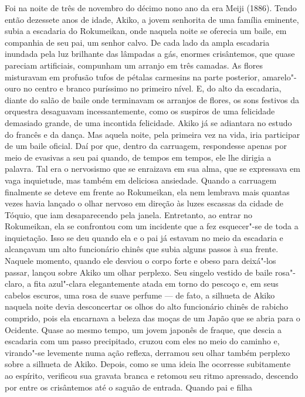 \noindent{}Foi na noite de três de novembro do décimo nono ano da era Meiji (1886).
Tendo então dezessete anos de idade, Akiko, a jovem senhorita de uma
família eminente, subia a escadaria do Rokumeikan, onde naquela noite
se oferecia um baile, em companhia de seu pai, um senhor calvo. De cada
lado da ampla escadaria inundada pela luz brilhante das lâmpadas a gás,
enormes crisântemos, que quase pareciam artificiais, compunham um
arranjo em três camadas. As flores misturavam em profusão tufos de
pétalas carmesins na parte posterior, amarelo"-ouro no centro e branco
puríssimo no primeiro nível. E, do alto da escadaria, diante do salão
de baile onde terminavam os arranjos de flores, os sons festivos da
orquestra desaguavam incessantemente, como os suspiros de uma
felicidade demasiado grande, de uma incontida felicidade. Akiko já se
adiantara no estudo do francês e da dança. Mas aquela noite, pela
primeira vez na vida, iria participar de um baile oficial. Daí por que,
dentro da carruagem, respondesse apenas por meio de evasivas a seu pai
quando, de tempos em tempos, ele lhe dirigia a palavra. Tal era o
nervosismo que se enraizava em sua alma, que se expressava em vaga
inquietude, mas também em deliciosa ansiedade. Quando a carruagem
finalmente se deteve em frente ao Rokumeikan, ela nem lembrava mais
quantas vezes havia lançado o olhar nervoso em direção às luzes
escassas da cidade de Tóquio, que iam desaparecendo pela janela.
Entretanto, ao entrar no Rokumeikan, ela se confrontou com um incidente
que a fez esquecer"-se de toda a inquietação. Isso se deu quando ela e o
pai já estavam no meio da escadaria e alcançavam um alto funcionário
chinês que subia alguns passos à sua frente. Naquele momento, quando
ele desviou o corpo forte e obeso para deixá"-los passar, lançou sobre
Akiko um olhar perplexo. Seu singelo vestido de baile rosa"-claro, a
fita azul"-clara elegantemente atada em torno do pescoço e, em seus
cabelos escuros, uma rosa de suave perfume --- de fato, a silhueta de
Akiko naquela noite devia desconcertar os olhos do alto funcionário
chinês de rabicho comprido, pois ela encarnava a beleza das moças de um
Japão que se abria para o Ocidente. Quase ao mesmo tempo, um jovem
japonês de fraque, que descia a escadaria com um passo precipitado,
cruzou com eles no meio do caminho e, virando"-se levemente numa ação
reflexa, derramou seu olhar também perplexo sobre a silhueta de Akiko.
Depois, como se uma ideia lhe ocorresse subitamente ao espírito,
verificou sua gravata branca e retomou seu ritmo apressado, descendo
por entre os crisântemos até o saguão de entrada. Quando pai e filha
